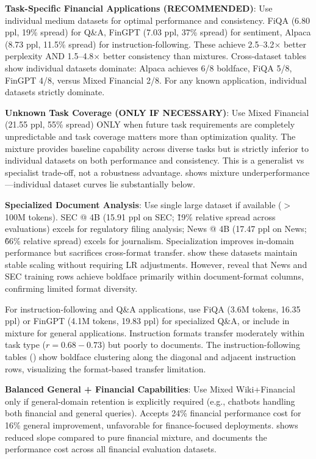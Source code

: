 \textbf{Task-Specific Financial Applications (RECOMMENDED)}: Use individual medium datasets for optimal performance and consistency. FiQA (6.80 ppl, 19\% spread) for Q\&A, FinGPT (7.03 ppl, 37\% spread) for sentiment, Alpaca (8.73 ppl, 11.5\% spread) for instruction-following. These achieve 2.5–3.2$\times$ better perplexity AND 1.5–4.8$\times$ better consistency than mixtures. Cross-dataset tables show individual datasets dominate: Alpaca achieves 6/8 boldface, FiQA 5/8, FinGPT 4/8, versus Mixed Financial 2/8. For any known application, individual datasets strictly dominate.

\textbf{Unknown Task Coverage (ONLY IF NECESSARY)}: Use Mixed Financial (21.55 ppl, 55\% spread) ONLY when future task requirements are completely unpredictable and task coverage matters more than optimization quality. The mixture provides baseline capability across diverse tasks but is strictly inferior to individual datasets on both performance and consistency. This is a generalist vs specialist trade-off, not a robustness advantage.  shows mixture underperformance—individual dataset curves lie substantially below.

\textbf{Specialized Document Analysis}: Use single large dataset if available ($>$ 100M tokens). SEC @ 4B (15.91 ppl on SEC; \~19\% relative spread across evaluations) excels for regulatory filing analysis; News @ 4B (17.47 ppl on News; \~66\% relative spread) excels for journalism. Specialization improves in-domain performance but sacrifices cross-format transfer.  show these datasets maintain stable scaling without requiring LR adjustments. However,  reveal that News and SEC training rows achieve boldface primarily within document-format columns, confirming limited format diversity.

For instruction-following and Q\&A applications, use FiQA (3.6M tokens, 16.35 ppl) or FinGPT (4.1M tokens, 19.83 ppl) for specialized Q\&A, or include in mixture for general applications. Instruction formats transfer moderately within task type ($r = 0.68-0.73$) but poorly to documents. The instruction-following tables () show boldface clustering along the diagonal and adjacent instruction rows, visualizing the format-based transfer limitation.

\textbf{Balanced General + Financial Capabilities}: Use Mixed Wiki+Financial only if general-domain retention is explicitly required (e.g., chatbots handling both financial and general queries). Accepts 24\% financial performance cost for 16\% general improvement, unfavorable for finance-focused deployments.  shows reduced slope compared to pure financial mixture, and  documents the performance cost across all financial evaluation datasets.

